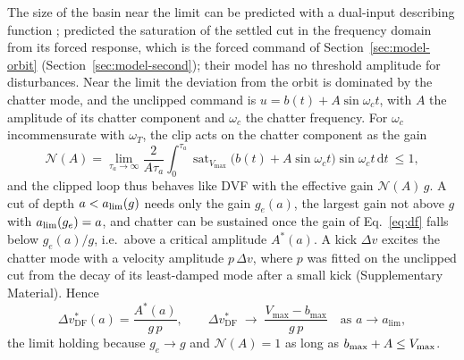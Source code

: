 The size of the basin near the limit can be predicted with a dual-input describing function \citep{gelb1968describing}; \citet{ozsoy2025frequency} predicted the saturation of the settled cut in the frequency domain from its forced response, which is the forced command of Section~\ref{sec:model-orbit} (Section~\ref{sec:model-second}); their model has no threshold amplitude for disturbances. Near the limit the deviation from the orbit is dominated by the chatter mode, and the unclipped command is $u=b(t)+A\sin\omega_ct$, with $A$ the amplitude of its chatter component and $\omega_c$ the chatter frequency. For $\omega_c$ incommensurate with $\omega_T$, the clip acts on the chatter component as the gain
\begin{equation}\label{eq:df}
  \mathcal N(A)=\lim_{\tau_a\to\infty}\frac{2}{A\tau_a}\int_0^{\tau_a}\operatorname{sat}_{V_{\max}}\bigl(b(t)+A\sin\omega_ct\bigr)\sin\omega_ct\,\mathrm dt\ \le 1,
\end{equation}
and the clipped loop thus behaves like DVF with the effective gain $\mathcal N(A)\,g$. A cut of depth $a<a_{\lim}(g)$ needs only the gain $g_e(a)$, the largest gain not above $g$ with $a_{\lim}(g_e)=a$, and chatter can be sustained once the gain of Eq.~\eqref{eq:df} falls below $g_e(a)/g$, i.e.\ above a critical amplitude $A^*(a)$. A kick $\Delta v$ excites the chatter mode with a velocity amplitude $p\,\Delta v$, where $p$ was fitted on the unclipped cut from the decay of its least-damped mode after a small kick (Supplementary Material). Hence
\begin{equation}\label{eq:dfbasin}
  \Delta v^*_{\mathrm{DF}}(a)=\frac{A^*(a)}{g\,p},\qquad
  \Delta v^*_{\mathrm{DF}}\;\to\;\frac{V_{\max}-b_{\max}}{g\,p}\quad\text{as }a\to a_{\lim},
\end{equation}
the limit holding because $g_e\to g$ and $\mathcal N(A)=1$ as long as $b_{\max}+A\le V_{\max}$.

